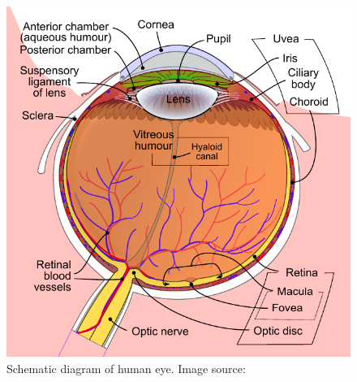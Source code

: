 \begin{figure}[h!]
\centering
\includegraphics[width=0.59\columnwidth]{images/other/eye_schematic}
\caption[Schematic diagram of the human eye]{Schematic diagram of human eye. Image source: \cite{eyeschematic}}
\label{fig:eye_schematic}
\end{figure}

